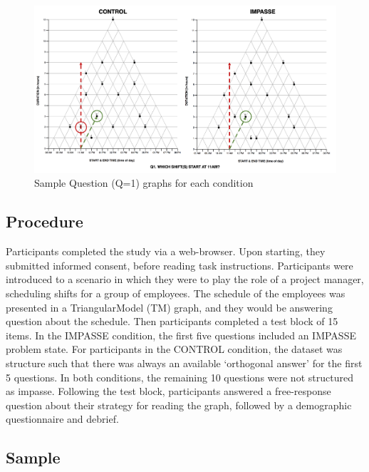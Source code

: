 \documentclass[
  letterpaper,
  DIV=11,
  numbers=noendperiod]{scrreprt}
\begin{document}
\begin{figure}

{\centering \includegraphics{analysis/SGC3A/static/stimuli/3A_conditions.png}

}

\caption{\label{fig-conditions}Sample Question (Q=1) graphs for each
condition}

\end{figure}

\hypertarget{procedure}{%
\subsection*{Procedure}\label{procedure}}

Participants completed the study via a web-browser. Upon starting, they
submitted informed consent, before reading task instructions.
Participants were introduced to a scenario in which they were to play
the role of a project manager, scheduling shifts for a group of
employees. The schedule of the employees was presented in a
TriangularModel (TM) graph, and they would be answering question about
the schedule. Then participants completed a test block of 15 items. In
the IMPASSE condition, the first five questions included an IMPASSE
problem state. For participants in the CONTROL condition, the dataset
was structure such that there was always an available `orthogonal
answer' for the first 5 questions. In both conditions, the remaining 10
questions were not structured as impasse. Following the test block,
participants answered a free-response question about their strategy for
reading the graph, followed by a demographic questionnaire and debrief.

\hypertarget{sample}{%
\subsection*{Sample}\label{sample}}
\end{document}
